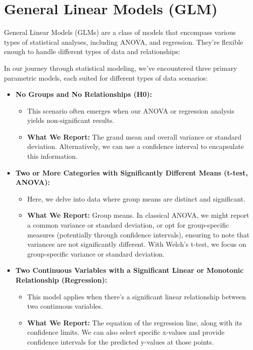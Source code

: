 \documentclass[
  letterpaper,
  DIV=11,
  numbers=noendperiod]{scrreprt}
\providecommand{\tightlist}{%
  \setlength{\itemsep}{0pt}\setlength{\parskip}{0pt}}\usepackage{longtable,booktabs,array}
\begin{document}
\section{General Linear Models (GLM)}\label{general-linear-models-glm}

General Linear Models (GLMs) are a class of models that encompass
various types of statistical analyses, including ANOVA, and regression.
They're flexible enough to handle different types of data and
relationships:

In our journey through statistical modeling, we've encountered three
primary parametric models, each suited for different types of data
scenarios:

\begin{itemize}
\tightlist
\item
  \textbf{No Groups and No Relationships (H0):}

  \begin{itemize}
  \tightlist
  \item
    This scenario often emerges when our ANOVA or regression analysis
    yields non-significant results.
  \item
    \textbf{What We Report:} The grand mean and overall variance or
    standard deviation. Alternatively, we can use a confidence interval
    to encapsulate this information.
  \end{itemize}
\item
  \textbf{Two or More Categories with Significantly Different Means
  (t-test, ANOVA):}

  \begin{itemize}
  \tightlist
  \item
    Here, we delve into data where group means are distinct and
    significant.
  \item
    \textbf{What We Report:} Group means. In classical ANOVA, we might
    report a common variance or standard deviation, or opt for
    group-specific measures (potentially through confidence intervals),
    ensuring to note that variances are not significantly different.
    With Welch's t-test, we focus on group-specific variance or standard
    deviation.
  \end{itemize}
\item
  \textbf{Two Continuous Variables with a Significant Linear or
  Monotonic Relationship (Regression):}

  \begin{itemize}
  \tightlist
  \item
    This model applies when there's a significant linear relationship
    between two continuous variables.
  \item
    \textbf{What We Report:} The equation of the regression line, along
    with its confidence limits. We can also select specific x-values and
    provide confidence intervals for the predicted y-values at those
    points.
  \end{itemize}
\end{itemize}
\end{document}
